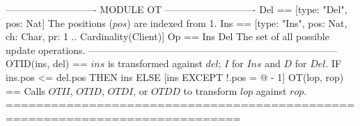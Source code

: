 \documentclass{article}
\begin{document}
\begin{tla}
---------------------------- MODULE OT ----------------------------
Del == [type: {"Del"}, pos: Nat] \* The positions ($pos$) are indexed from 1.
Ins == [type: {"Ins"}, pos: Nat, ch: Char, pr: 1 .. Cardinality(Client)]
Op == Ins \cup Del \* The set of all possible update operations.
-----------------------------------------------------------------------------
OTID(ins, del) == \* $ins$ is transformed against $del$; $I$ for $Ins$ and $D$ for $Del$.
    IF ins.pos <= del.pos THEN ins ELSE [ins EXCEPT !.pos = @ - 1]
OT(lop, rop) == \* Calls $OTII$, $OTID$, $OTDI$, or $OTDD$ to transform $lop$ against $rop$.
=============================================================================
\end{tla}
\end{document}
